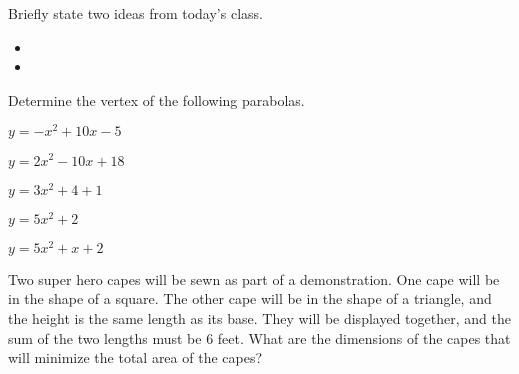 \begin{problem}
\item Briefly state two ideas from today's class.
  \begin{itemize}
  \item
  \item
  \end{itemize}

\item Determine the vertex of the following parabolas.
  \begin{subproblem}
  \item $y=-x^2+10x-5$
  \item $y=2x^2-10x+18$
  \item $y=3x^2+4+1$
  \item $y=5x^2+2$
  \item $y=5x^2+x+2$
  \end{subproblem}

\item Two super hero capes will be sewn as part of a
  demonstration. One cape will be in the shape of a square. The other
  cape will be in the shape of a triangle, and the height is the same
  length as its base. They will be displayed together, and the sum of
  the two lengths must be 6 feet. What are the dimensions of the capes
  that will minimize the total area of the capes?
\end{problem}


